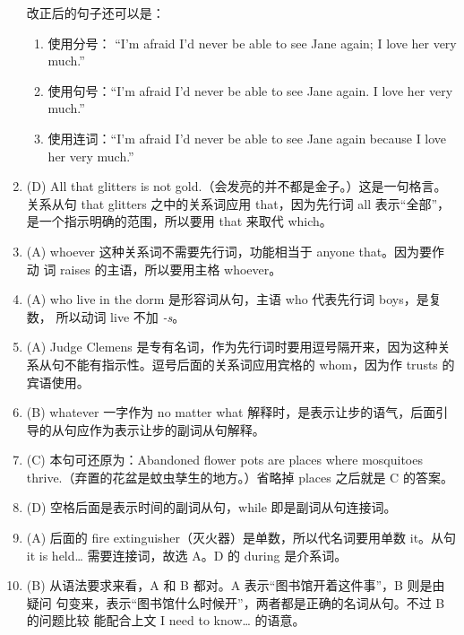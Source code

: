 \begin{enumerate}
{    改正后的句子还可以是：
    \begin{enumerate}

    \item 使用分号： “I'm afraid I'd never be able to see Jane again; I love
      her very much.”
    \item 使用句号：“I'm afraid I'd never be able to see Jane again. I love
      her very much.”
    \item 使用连词：“I'm afraid I'd never be able to see Jane again because I
      love her very much.”
    \end{enumerate}
  }

\item (D) All that glitters is not gold.（会发亮的并不都是金子。）这是一句格言。
  关系从句 that glitters 之中的关系词应用 that，因为先行词 all 表示“全部”，
  是一个指示明确的范围，所以要用 that 来取代 which。

\item (A) whoever 这种关系词不需要先行词，功能相当于 anyone that。因为要作动
  词 raises 的主语，所以要用主格 whoever。

\item  (A) who live in the dorm 是形容词从句，主语 who 代表先行词 boys，是复数， 所以动词 live 不加 \emph{-s}。
\item (A) Judge Clemens 是专有名词，作为先行词时要用逗号隔开来，因为这种关系从句不能有指示性。逗号后面的关系词应用宾格的 whom，因为作 trusts 的宾语使用。

\item (B) whatever 一字作为 no matter what 解释时，是表示让步的语气，后面引导的从句应作为表示让步的副词从句解释。

\item (C) 本句可还原为：Abandoned flower pots are places where mosquitoes thrive.（弃置的花盆是蚊虫孳生的地方。）省略掉 places 之后就是 C 的答案。


\item (D) 空格后面是表示时间的副词从句，while 即是副词从句连接词。

\item  (A) 后面的 fire extinguisher（灭火器）是单数，所以代名词要用单数 it。从句 it is held… 需要连接词，故选 A。D 的 during 是介系词。
\item (B) 从语法要求来看，A 和 B 都对。A 表示“图书馆开着这件事”，B 则是由疑问
  句变来，表示“图书馆什么时候开”，两者都是正确的名词从句。不过 B 的问题比较
  能配合上文 I need to know… 的语意。
\end{enumerate}


